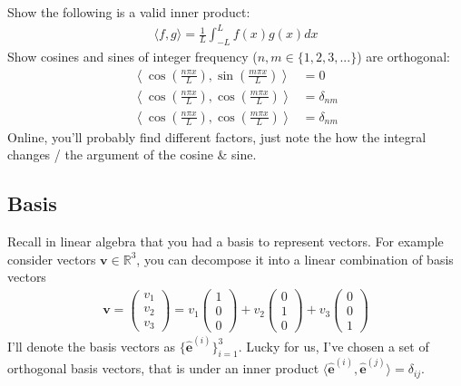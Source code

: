 \documentclass[12pt,fleqn]{article}
\numberwithin{equation}{section} %
\newcounter{problem}
\begin{document}
\begin{problem}
	Show the following is a valid inner product:
	\begin{align}
		\langle f, g \rangle = \frac{1}{L} \int_{-L}^L f(x) g(x) dx
	\end{align}
	Show cosines and sines of integer frequency ($n,m \in \{1, 2, 3, ...\}$) are orthogonal:
	\begin{align}
		\left \langle \cos\left(\frac{n \pi x}{L}\right), \sin\left(\frac{m \pi x}{L} \right) \right\rangle & = 0 \\
		\left \langle \cos\left(\frac{n \pi x}{L}\right), \cos\left(\frac{m \pi x}{L} \right) \right\rangle & =   \delta_{nm} \\
		\left \langle \cos\left(\frac{n \pi x}{L}\right), \cos\left(\frac{m \pi x}{L} \right) \right\rangle  & =  \delta_{nm}
	\end{align}
	Online, you'll probably find different factors, just note the how the integral changes / the argument of the cosine \& sine.
\end{problem}

\subsection{Basis}
Recall in linear algebra that you had a basis to represent vectors. For example consider vectors $\mathbf v \in \mathbb R^3$, you can decompose it into a linear combination of basis vectors
\begin{align}
	\mathbf v = \begin{pmatrix}
		v_1 \\ v_2 \\ v_3 
	\end{pmatrix} = v_1 \begin{pmatrix}
		1 \\ 0 \\ 0
	\end{pmatrix} + v_2 \begin{pmatrix}
		0 \\ 1\\ 0
 	\end{pmatrix} + v_3 \begin{pmatrix}
 		0 \\ 0 \\ 1
 	\end{pmatrix}
\end{align}I'll denote the basis vectors as $\{\mathbf{\hat e}^{(i)}\}_{i=1}^3$. Lucky for us, I've chosen a set of orthogonal basis vectors, that is under an inner product $\langle \mathbf{\hat e}^{(i)}, \mathbf{\hat e}^{(j)} \rangle = \delta_{ij}$.
\end{document}
